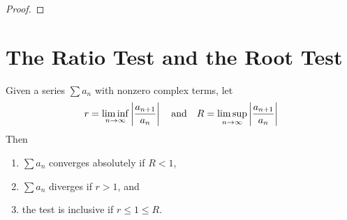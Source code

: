 \documentclass[thmcnt=section, 12pt]{my-elegantbook}
\begin{document}
\begin{proof}
\end{proof}


\section{The Ratio Test and the Root Test}


\begin{theorem} \label{thm:54}
    Given a series $\sum a_n$ with nonzero complex terms, let 
    \begin{align*}
        r = \liminf_{n \to \infty} \left\lvert \frac{a_{n+1}}{a_n} \right\rvert
        \quad \text{and} \quad
        R = \limsup_{n \to \infty} \left\lvert \frac{a_{n+1}}{a_n} \right\rvert
    \end{align*}
    Then 
    \begin{enumerate}
        \item $\sum a_n$ converges absolutely if $R < 1$,
        \item $\sum a_n$ diverges if $r > 1$, and
        \item the test is inclusive if $r \leq 1 \leq R$.
    \end{enumerate}
\end{theorem}
\end{document}

